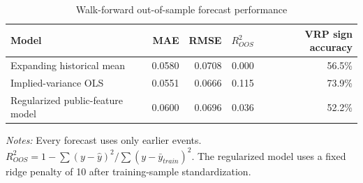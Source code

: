 \begin{table}[!htbp]
\centering
\caption{Walk-forward out-of-sample forecast performance}
\label{tab:oos}
\begin{tabular}{lrrrr}
\toprule
Model & MAE & RMSE & $R^2_{OOS}$ & VRP sign accuracy \\
\midrule
Expanding historical mean & 0.0580 & 0.0708 & 0.000 & 56.5\% \\
Implied-variance OLS & 0.0551 & 0.0666 & 0.115 & 73.9\% \\
Regularized public-feature model & 0.0600 & 0.0696 & 0.036 & 52.2\% \\
\bottomrule
\end{tabular}
\begin{minipage}{0.92\linewidth}
\footnotesize \textit{Notes:} Every forecast uses only earlier events. $R^2_{OOS}=1-\sum(y-\hat y)^2/\sum(y-\bar y_{train})^2$. The regularized model uses a fixed ridge penalty of 10 after training-sample standardization.
\end{minipage}
\end{table}
